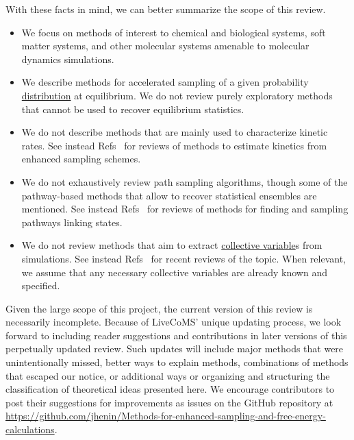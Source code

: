 \documentclass[9pt,review]{livecoms}
\begin{document}
With these facts in mind, we can better summarize the scope of this review.

\begin{itemize}
    \item We focus on methods of interest to chemical and biological systems, soft matter systems, and other molecular systems amenable to molecular dynamics simulations.
    \item We describe methods for accelerated sampling of a given probability \hyperlink{ref:Distribution} {distribution} at equilibrium.
    We do not review purely exploratory methods that cannot be used to recover equilibrium statistics.
    \item We do not describe methods that are mainly used to characterize kinetic rates. See instead Refs~\cite{BRUCE20181,doi:10.1146/annurev-physchem-042018-052340,Dickson:2017:1568-0266:2626,10.1021/acs.biochem.8b00977,https://doi.org/10.1002/wcms.1455,Kieninger2020} for reviews of methods to estimate kinetics from enhanced sampling schemes.
    \item We do not exhaustively review path sampling algorithms, though some of the pathway-based methods that allow to recover statistical ensembles are mentioned. See instead Refs~\cite{DellagoBolhuis,CHONG201788,Peters2017,Elber2020}
    for reviews of methods for finding and sampling pathways linking states.
    \item We do not review methods that aim to extract \hyperlink{ref:CV} {collective variable}s from simulations. See instead Refs~\cite{WANG2020139,doi:10.1080/00268976.2020.1737742,doi:10.1021/acs.jctc.0c00355} for recent reviews of the topic. When relevant, we assume that any necessary collective variables are already known and specified.
\end{itemize}

Given the large scope of this project, the current version of this review is necessarily incomplete. Because of LiveCoMS' unique updating process, we look forward to including reader suggestions and contributions in later versions of this perpetually updated review. Such updates will include major methods that were unintentionally missed, better ways to explain methods, combinations of methods that escaped our notice, or additional ways or organizing and structuring the classification of theoretical ideas presented here. We encourage contributors to post their suggestions for improvements as issues on the GitHub repository at \url{https://github.com/jhenin/Methods-for-enhanced-sampling-and-free-energy-calculations}.
\end{document}
